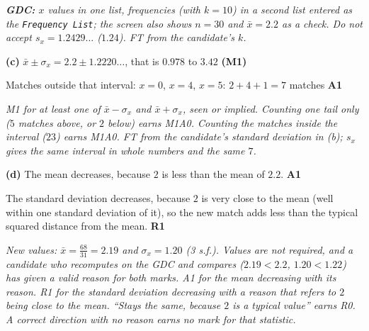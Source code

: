 \documentclass[12pt, twoside]{article}
\begin{document}
\begin{enumerate}[itemsep=0.3cm]
\emph{\textbf{GDC:} $x$ values in one list, frequencies (with $k = 10$) in a
second list entered as the \texttt{Frequency List}; the screen also shows
$n = 30$ and $\bar{x} = 2.2$ as a check. Do not accept $s_{x} = 1.2429\ldots$
($1.24$). FT from the candidate's $k$.}

\textbf{(c)} $\bar{x} \pm \sigma_{x} = 2.2 \pm 1.2220\ldots$, \quad that is
$0.978$ to $3.42$ \hfill \textbf{(M1)}

Matches outside that interval: $x = 0$, $x = 4$, $x = 5$: \quad
$2 + 4 + 1 = 7$ matches \hfill \textbf{A1}

\emph{M1 for at least one of $\bar{x} - \sigma_{x}$ and $\bar{x} + \sigma_{x}$,
seen or implied. Counting one tail only ($5$ matches above, or $2$ below)
earns M1A0. Counting the matches \emph{inside} the interval ($23$) earns
M1A0. FT from the candidate's standard deviation in (b); $s_{x}$ gives the
same interval in whole numbers and the same $7$.}

\textbf{(d)} The mean decreases, because $2$ is less than the mean of $2.2$.
\hfill \textbf{A1}

The standard deviation decreases, because $2$ is very close to the mean
(well within one standard deviation of it), so the new match adds less than
the typical squared distance from the mean. \hfill \textbf{R1}

\emph{New values: $\bar{x} = \frac{68}{31} = 2.19$ and $\sigma_{x} = 1.20$
(3 s.f.). Values are not required, and a candidate who recomputes on the GDC
and compares ($2.19 < 2.2$, $1.20 < 1.22$) has given a valid reason for both
marks. A1 for the mean decreasing with its reason. R1 for the standard
deviation decreasing with a reason that refers to $2$ being close to the
mean. ``Stays the same, because $2$ is a typical value'' earns R0. A correct
direction with no reason earns no mark for that statistic.}

\end{enumerate}
\end{document}
